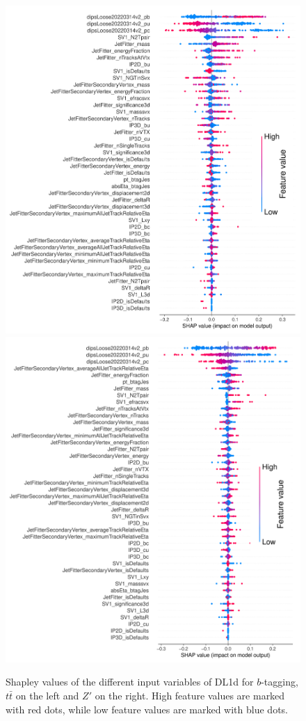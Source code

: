 \begin{figure}
  \centering
  \includegraphics[scale=0.7]{Images/FTAG/DL1d/Shap/ttb.png}
  \includegraphics[scale=0.7]{Images/FTAG/DL1d/Shap/zpb.png}
  \caption{Shapley values of the different input variables of DL1d for $b$-tagging, $t\bar{t}$ on the left and $Z'$ on the right. High feature values are marked with red dots, while low feature values are marked with blue dots.} 
  \label{fig:DL1dshapb}
\end{figure} 


